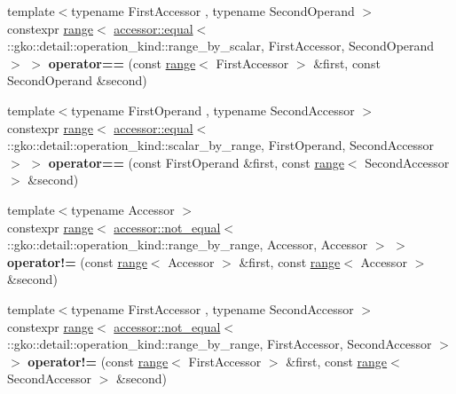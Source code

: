 \begin{DoxyCompactItemize}
\item 
\mbox{\label{namespacegko_ae093d67dc43ee09722642623abfef970}} 
{\footnotesize template$<$typename First\+Accessor , typename Second\+Operand $>$ }\\constexpr \hyperlink{classgko_1_1range}{range}$<$ \hyperlink{structgko_1_1accessor_1_1equal}{accessor\+::equal}$<$ \+::gko\+::detail\+::operation\+\_\+kind\+::range\+\_\+by\+\_\+scalar, First\+Accessor, Second\+Operand $>$ $>$ {\bfseries operator==} (const \hyperlink{classgko_1_1range}{range}$<$ First\+Accessor $>$ \&first, const Second\+Operand \&second)
\item 
\mbox{\label{namespacegko_a045f895f0a9784b07f8df78507b278ac}} 
{\footnotesize template$<$typename First\+Operand , typename Second\+Accessor $>$ }\\constexpr \hyperlink{classgko_1_1range}{range}$<$ \hyperlink{structgko_1_1accessor_1_1equal}{accessor\+::equal}$<$ \+::gko\+::detail\+::operation\+\_\+kind\+::scalar\+\_\+by\+\_\+range, First\+Operand, Second\+Accessor $>$ $>$ {\bfseries operator==} (const First\+Operand \&first, const \hyperlink{classgko_1_1range}{range}$<$ Second\+Accessor $>$ \&second)
\item 
\mbox{\label{namespacegko_a3192cdc0e20795c77068697d2fbb87b3}} 
{\footnotesize template$<$typename Accessor $>$ }\\constexpr \hyperlink{classgko_1_1range}{range}$<$ \hyperlink{structgko_1_1accessor_1_1not__equal}{accessor\+::not\+\_\+equal}$<$ \+::gko\+::detail\+::operation\+\_\+kind\+::range\+\_\+by\+\_\+range, Accessor, Accessor $>$ $>$ {\bfseries operator!=} (const \hyperlink{classgko_1_1range}{range}$<$ Accessor $>$ \&first, const \hyperlink{classgko_1_1range}{range}$<$ Accessor $>$ \&second)
\item 
\mbox{\label{namespacegko_acaba7c56d10cf4ac78abbf1915abc813}} 
{\footnotesize template$<$typename First\+Accessor , typename Second\+Accessor $>$ }\\constexpr \hyperlink{classgko_1_1range}{range}$<$ \hyperlink{structgko_1_1accessor_1_1not__equal}{accessor\+::not\+\_\+equal}$<$ \+::gko\+::detail\+::operation\+\_\+kind\+::range\+\_\+by\+\_\+range, First\+Accessor, Second\+Accessor $>$ $>$ {\bfseries operator!=} (const \hyperlink{classgko_1_1range}{range}$<$ First\+Accessor $>$ \&first, const \hyperlink{classgko_1_1range}{range}$<$ Second\+Accessor $>$ \&second)

\end{DoxyCompactItemize}
